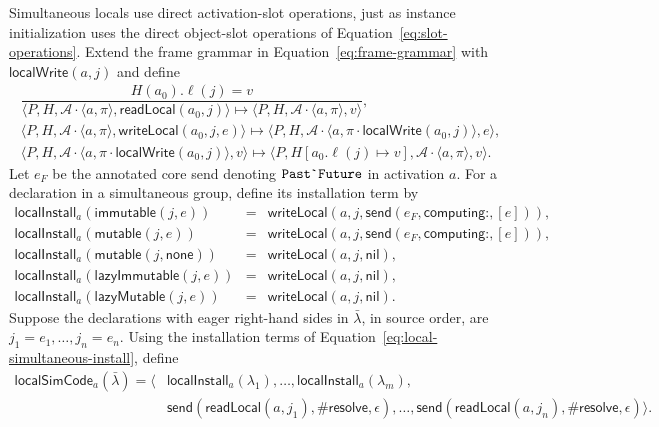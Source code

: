 \documentclass[11pt]{article}
\numberwithin{equation}{section}
\newcommand{\kw}[1]{\ensuremath{\mathsf{#1}}}
\newcommand{\nil}{\kw{nil}}
\newcommand{\kws}[1]{\ensuremath{\mathsf{#1\mathord{:}}}}
\newcommand{\PastFuture}{\ensuremath{\text{\texttt{Past\textasciigrave Future}}}}
\begin{document}
Simultaneous locals use direct activation-slot operations, just as instance
initialization uses the direct object-slot operations of
Equation~\eqref{eq:slot-operations}.  Extend the frame grammar in
Equation~\eqref{eq:frame-grammar} with $\kw{localWrite}(a,j)$ and define
\begin{equation}\label{eq:local-slot-operations}
\begin{array}{c}
\dfrac{H(a_0).\ell(j)=v}
 {\langle P,H,\mathcal A\cdot\langle a,\pi\rangle,
       \kw{readLocal}(a_0,j)\rangle
  \longmapsto
  \langle P,H,\mathcal A\cdot\langle a,\pi\rangle,v\rangle},\\[3mm]
 \langle P,H,\mathcal A\cdot\langle a,\pi\rangle,
       \kw{writeLocal}(a_0,j,e)\rangle
 \longmapsto
 \langle P,H,\mathcal A\cdot
       \langle a,\pi\cdot\kw{localWrite}(a_0,j)\rangle,e\rangle,\\[3mm]
 \langle P,H,\mathcal A\cdot
       \langle a,\pi\cdot\kw{localWrite}(a_0,j)\rangle,v\rangle
 \longmapsto
 \langle P,H[a_0.\ell(j)\mapsto v],
       \mathcal A\cdot\langle a,\pi\rangle,v\rangle.
\end{array}
\end{equation}
Let $e_F$ be the annotated core send denoting \PastFuture{} in activation $a$.
For a declaration in a simultaneous group, define its installation term by
\begin{equation}\label{eq:local-simultaneous-install}
\begin{array}{rcl}
 \mathsf{localInstall}_a(\kw{immutable}(j,e))
  &=&\kw{writeLocal}(a,j,\kw{send}(e_F,\kws{computing},[e])),\\
 \mathsf{localInstall}_a(\kw{mutable}(j,e))
  &=&\kw{writeLocal}(a,j,\kw{send}(e_F,\kws{computing},[e])),\\
 \mathsf{localInstall}_a(\kw{mutable}(j,\kw{none}))
  &=&\kw{writeLocal}(a,j,\nil),\\
 \mathsf{localInstall}_a(\kw{lazyImmutable}(j,e))
  &=&\kw{writeLocal}(a,j,\nil),\\
 \mathsf{localInstall}_a(\kw{lazyMutable}(j,e))
  &=&\kw{writeLocal}(a,j,\nil).
\end{array}
\end{equation}
Suppose the declarations with eager right-hand sides in $\bar\lambda$, in
source order, are $j_1=e_1,\ldots,j_n=e_n$.  Using the installation terms of
Equation~\eqref{eq:local-simultaneous-install}, define
\begin{equation}\label{eq:local-simultaneous-expansion}
\begin{split}
 \mathsf{localSimCode}_a(\bar\lambda)=\langle{}
 &\mathsf{localInstall}_a(\lambda_1),\ldots,
   \mathsf{localInstall}_a(\lambda_m),\\
 &\kw{send}(\kw{readLocal}(a,j_1),\#\kw{resolve},\epsilon),\ldots,
  \kw{send}(\kw{readLocal}(a,j_n),\#\kw{resolve},\epsilon)\rangle.
\end{split}
\end{equation}
\end{document}

